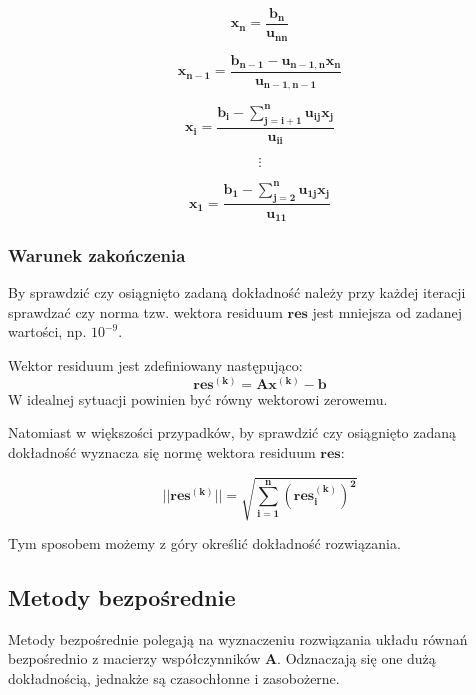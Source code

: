 \documentclass{article}
\begin{document}
\begin{equation*}
    \boldsymbol{x_n = \frac{b_n}{u_{nn}}}
\end{equation*}

\begin{equation*}
    \boldsymbol{x_{n-1} = \frac{b_{n-1} - u_{n-1,n}x_n}{u_{n-1,n-1}}}
\end{equation*}

\begin{equation*}
    \boldsymbol{x_i = \frac{b_i - \sum_{j=i+1}^{n}u_{ij}x_j}{u_{ii}}}
\end{equation*}

\begin{equation*}
    \boldsymbol{\vdots}
\end{equation*}

\begin{equation*}
    \boldsymbol{x_1 = \frac{b_1 - \sum_{j=2}^{n}u_{1j}x_j}{u_{11}}}
\end{equation*}

\subsubsection{Warunek zakończenia}
By sprawdzić czy osiągnięto zadaną dokładność należy przy każdej iteracji
sprawdzać czy norma tzw. wektora residuum $\boldsymbol{res}$ jest mniejsza 
od zadanej wartości, np. $10^{-9}$.

Wektor residuum jest zdefiniowany następująco:
\begin{equation}
    \boldsymbol{res^{(k)} = Ax^{(k)}-b}
\end{equation}
W idealnej sytuacji powinien być równy wektorowi zerowemu.

Natomiast w większości przypadków, by sprawdzić czy osiągnięto zadaną dokładność
wyznacza się normę wektora residuum $\boldsymbol{res}$:

\begin{equation}
    \boldsymbol{||res^{(k)}|| = \sqrt{\sum_{i=1}^{n}(res_i^{(k)})^2}}
\end{equation}

Tym sposobem możemy z góry określić dokładność rozwiązania.

\subsection{Metody bezpośrednie}
Metody bezpośrednie polegają na wyznaczeniu rozwiązania układu równań
bezpośrednio z macierzy współczynników $\boldsymbol{A}$. Odznaczają się one
dużą dokładnością, jednakże są czasochłonne i zasobożerne.
\end{document}
